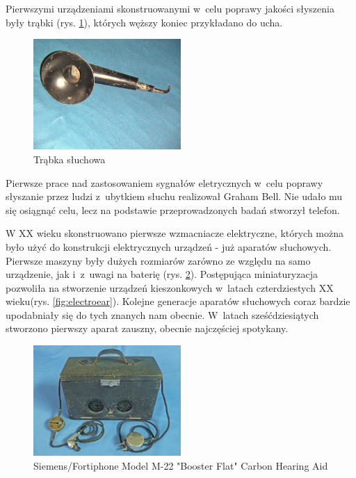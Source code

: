 \documentclass[journal]{IEEEtran}
\begin{document}
Pierwszymi urządzeniami skonstruowanymi w~celu poprawy jakości słyszenia były trąbki (rys. \ref{fig:trumpet}), których węższy koniec przykładano do ucha.
\begin{figure}
    \includegraphics[width=0.5\textwidth]{trumpet}
    \caption{Trąbka słuchowa}
    \label{fig:trumpet}
\end{figure}

Pierwsze prace nad zastosowaniem sygnałów eletrycznych w~celu poprawy słyszanie przez ludzi z~ubytkiem słuchu realizował Graham Bell. Nie udało mu się osiągnąć celu, lecz na podstawie przeprowadzonych badań stworzył telefon.

W XX wieku skonstruowano pierwsze wzmacniacze elektryczne, których można było użyć do konstrukcji elektrycznych urządzeń - już aparatów słuchowych. Pierwsze maszyny były dużych rozmiarów zarówno ze względu na samo urządzenie, jak i~z~uwagi na baterię (rys. \ref{fig:siemens-old}). Postępująca miniaturyzacja pozwoliła na stworzenie urządzeń kieszonkowych w~latach czterdziestych XX wieku(rys. \ref{fig:electroear}). Kolejne generacje aparatów słuchowych coraz bardzie upodabniały się do tych znanych nam obecnie. W~latach sześćdziesiątych stworzono pierwszy aparat zauszny, obecnie najczęściej spotykany.

\begin{figure}
    \includegraphics[width=0.5\textwidth]{siemens_old}
    \caption{Siemens/Fortiphone Model M-22 "Booster Flat" Carbon Hearing Aid}
    \label{fig:siemens-old}
\end{figure}
\end{document}
